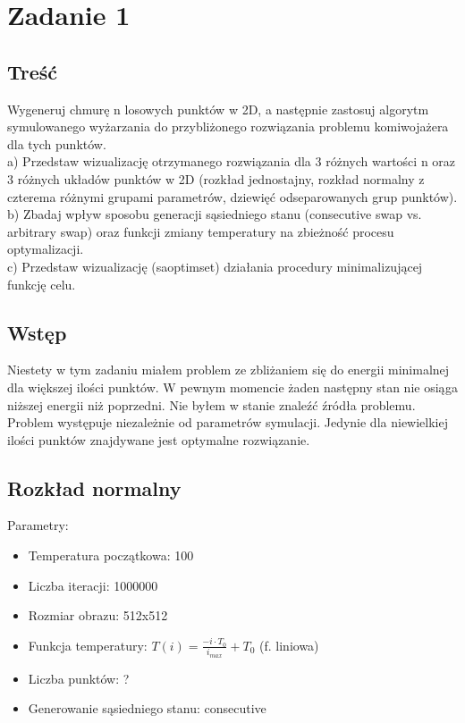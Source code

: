 \section{Zadanie 1}
\subsection{Treść}
Wygeneruj chmurę n losowych punktów w 2D, a następnie zastosuj algorytm symulowanego
wyżarzania do przybliżonego rozwiązania problemu komiwojażera dla tych punktów.\\
a) Przedstaw wizualizację otrzymanego rozwiązania dla 3 różnych wartości n oraz 3
różnych układów punktów w 2D (rozkład jednostajny, rozkład normalny z czterema
różnymi grupami parametrów, dziewięć odseparowanych grup punktów).\\
b) Zbadaj wpływ sposobu generacji sąsiedniego stanu (consecutive swap vs. arbitrary
swap) oraz funkcji zmiany temperatury na zbieżność procesu optymalizacji.\\
c) Przedstaw wizualizację (saoptimset) działania procedury minimalizującej funkcję
celu.
\subsection{Wstęp}
Niestety w tym zadaniu miałem problem ze zbliżaniem się do energii minimalnej dla większej ilości punktów. W pewnym momencie żaden następny stan nie osiąga niższej energii niż poprzedni. Nie byłem w stanie znaleźć źródła problemu. Problem występuje niezależnie od parametrów symulacji. Jedynie dla niewielkiej ilości punktów znajdywane jest optymalne rozwiązanie.

\subsection{Rozkład normalny}
Parametry:
\begin{itemize}
    \item Temperatura początkowa: 100
    \item Liczba iteracji: 1000000
    \item Rozmiar obrazu: 512x512
    \item Funkcja temperatury: $T(i) = \frac{-i\cdot T_0}{i_{max}} + T_0$ (f. liniowa)
    \item Liczba punktów: ?
    \item Generowanie sąsiedniego stanu: consecutive
\end{itemize}


